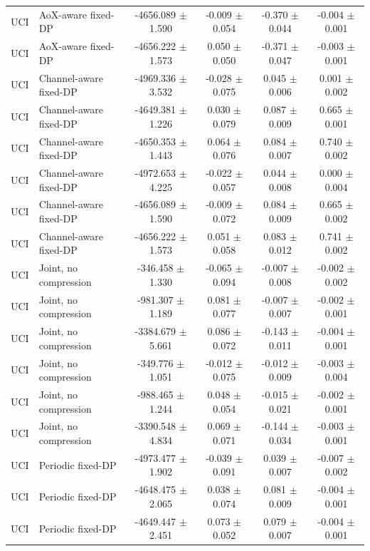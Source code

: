 \begin{tabular}{llcccc}
UCI & AoX-aware fixed-DP & -4656.089 $\pm$ 1.590 & -0.009 $\pm$ 0.054 & -0.370 $\pm$ 0.044 & -0.004 $\pm$ 0.001 \\
UCI & AoX-aware fixed-DP & -4656.222 $\pm$ 1.573 & 0.050 $\pm$ 0.050 & -0.371 $\pm$ 0.047 & -0.003 $\pm$ 0.001 \\
UCI & Channel-aware fixed-DP & -4969.336 $\pm$ 3.532 & -0.028 $\pm$ 0.075 & 0.045 $\pm$ 0.006 & 0.001 $\pm$ 0.002 \\
UCI & Channel-aware fixed-DP & -4649.381 $\pm$ 1.226 & 0.030 $\pm$ 0.079 & 0.087 $\pm$ 0.009 & 0.665 $\pm$ 0.001 \\
UCI & Channel-aware fixed-DP & -4650.353 $\pm$ 1.443 & 0.064 $\pm$ 0.076 & 0.084 $\pm$ 0.007 & 0.740 $\pm$ 0.002 \\
UCI & Channel-aware fixed-DP & -4972.653 $\pm$ 4.225 & -0.022 $\pm$ 0.057 & 0.044 $\pm$ 0.008 & 0.000 $\pm$ 0.004 \\
UCI & Channel-aware fixed-DP & -4656.089 $\pm$ 1.590 & -0.009 $\pm$ 0.072 & 0.084 $\pm$ 0.009 & 0.665 $\pm$ 0.002 \\
UCI & Channel-aware fixed-DP & -4656.222 $\pm$ 1.573 & 0.051 $\pm$ 0.058 & 0.083 $\pm$ 0.012 & 0.741 $\pm$ 0.002 \\
UCI & Joint, no compression & -346.458 $\pm$ 1.330 & -0.065 $\pm$ 0.094 & -0.007 $\pm$ 0.008 & -0.002 $\pm$ 0.002 \\
UCI & Joint, no compression & -981.307 $\pm$ 1.189 & 0.081 $\pm$ 0.077 & -0.007 $\pm$ 0.007 & -0.002 $\pm$ 0.001 \\
UCI & Joint, no compression & -3384.679 $\pm$ 5.661 & 0.086 $\pm$ 0.072 & -0.143 $\pm$ 0.011 & -0.004 $\pm$ 0.001 \\
UCI & Joint, no compression & -349.776 $\pm$ 1.051 & -0.012 $\pm$ 0.075 & -0.012 $\pm$ 0.009 & -0.003 $\pm$ 0.004 \\
UCI & Joint, no compression & -988.465 $\pm$ 1.244 & 0.048 $\pm$ 0.054 & -0.015 $\pm$ 0.021 & -0.002 $\pm$ 0.001 \\
UCI & Joint, no compression & -3390.548 $\pm$ 4.834 & 0.069 $\pm$ 0.071 & -0.144 $\pm$ 0.034 & -0.003 $\pm$ 0.001 \\
UCI & Periodic fixed-DP & -4973.477 $\pm$ 1.902 & -0.039 $\pm$ 0.091 & 0.039 $\pm$ 0.007 & -0.007 $\pm$ 0.002 \\
UCI & Periodic fixed-DP & -4648.475 $\pm$ 2.065 & 0.038 $\pm$ 0.074 & 0.081 $\pm$ 0.009 & -0.004 $\pm$ 0.001 \\
UCI & Periodic fixed-DP & -4649.447 $\pm$ 2.451 & 0.073 $\pm$ 0.052 & 0.079 $\pm$ 0.007 & -0.004 $\pm$ 0.001 \\

\end{tabular}
